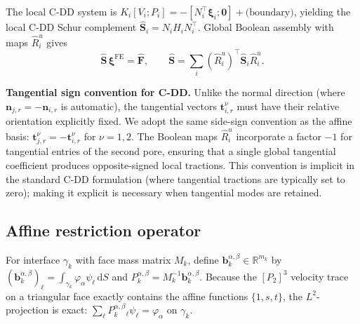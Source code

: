\documentclass[11pt,a4paper]{article}
\newcommand{\R}{\mathbb{R}}
\newcommand{\normal}{\bm{n}}
\newcommand{\Schur}{\mathbf{S}}
\begin{document}
The local C-DD system is
$K_i [V_i; P_i] = -[N_i^\top \bm{\xi}_i; \bm{0}] + \text{(boundary)}$,
yielding the local C-DD Schur complement
$\widehat{\Schur}_i = N_i H_i N_i^\top$.
Global Boolean assembly with maps $\widehat{R}_i^u$ gives
\begin{equation}\label{eq:cdd-global}
  \widehat{\Schur}\,\bm{\xi}^{\text{FE}} = \widehat{\bm{F}},\qquad
  \widehat{\Schur} = \sum_i (\widehat{R}_i^u)^\top
    \widehat{\Schur}_i \widehat{R}_i^u.
\end{equation}

\textbf{Tangential sign convention for C-DD.}
Unlike the normal direction (where $\normal_{j,r} = -\normal_{i,r}$
is automatic), the tangential vectors $\bm{t}_{i,r}^\nu$ must have their
relative orientation explicitly fixed.  We adopt the same side-sign
convention as the affine basis:
$\bm{t}_{j,r}^\nu = -\bm{t}_{i,r}^\nu$ for $\nu = 1,2$.
The Boolean maps $\widehat{R}_i^u$ incorporate a factor $-1$ for
tangential entries of the second pore, ensuring that a single global
tangential coefficient produces opposite-signed local tractions.
This convention is implicit in the standard C-DD formulation (where
tangential tractions are typically set to zero); making it explicit is
necessary when tangential modes are retained.

\subsection{Affine restriction operator}

For interface $\gamma_k$ with face mass matrix $M_k$, define
$\bm{b}_k^{\alpha,\beta} \in \R^{m_k}$ by
$(\bm{b}_k^{\alpha,\beta})_\ell
 = \int_{\gamma_k} \varphi_\alpha \psi_\ell \,\mathrm{d}S$
and $P_k^{\alpha,\beta} = M_k^{-1}\bm{b}_k^{\alpha,\beta}$.
Because the $[P_2]^3$ velocity trace on a triangular face exactly
contains the affine functions $\{1,s,t\}$, the $L^2$-projection is
exact: $\sum_\ell P_k^{\alpha,\beta}_\ell \psi_\ell = \varphi_\alpha$
on $\gamma_k$.
\end{document}
